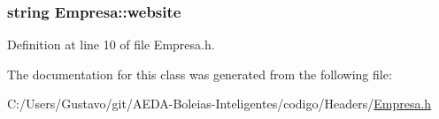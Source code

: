 \hypertarget{class_empresa_a809624b98d1db18f8627ce2fa394dddd}{
\subsubsection[{website}]{\setlength{\rightskip}{0pt plus 5cm}string Empresa\+::website\hspace{0.3cm}{\ttfamily [private]}}}\label{class_empresa_a809624b98d1db18f8627ce2fa394dddd}


Definition at line 10 of file Empresa.\+h.



The documentation for this class was generated from the following file\+:\begin{DoxyCompactItemize}
\item 
C\+:/\+Users/\+Gustavo/git/\+A\+E\+D\+A-\/\+Boleias-\/\+Inteligentes/codigo/\+Headers/\hyperlink{_empresa_8h}{Empresa.\+h}\end{DoxyCompactItemize}
